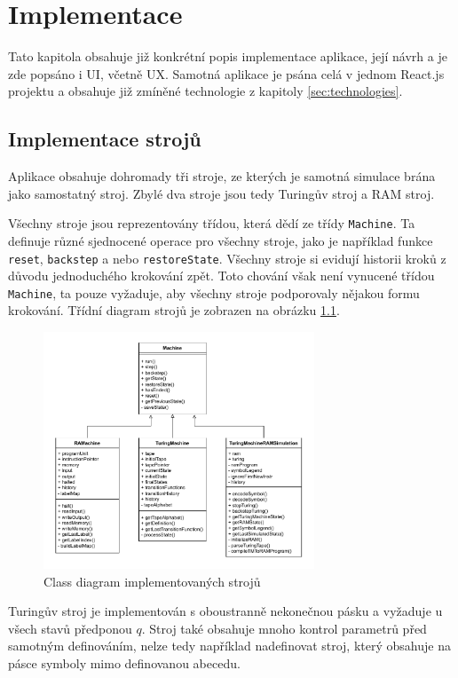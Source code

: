 \chapter{Implementace}
\label{sec:implementation}
Tato kapitola obsahuje již konkrétní popis implementace aplikace, její návrh a je zde popsáno i UI, včetně UX.
Samotná aplikace je psána celá v jednom React.js projektu a obsahuje již zmíněné technologie z kapitoly \ref{sec:technologies}.

\section{Implementace strojů}
\label{sec:machine_impl}
Aplikace obsahuje dohromady tři stroje, ze kterých je samotná simulace brána jako samostatný stroj. 
Zbylé dva stroje jsou tedy Turingův stroj a RAM stroj.

Všechny stroje jsou reprezentovány třídou, která dědí ze třídy \texttt{Machine}. Ta definuje různé sjednocené operace
pro všechny stroje, jako je například funkce \texttt{reset}, \texttt{backstep} a nebo \texttt{restoreState}. 
Všechny stroje si evidují historii kroků z důvodu jednoduchého krokování zpět. 
Toto chování však není vynucené třídou \texttt{Machine}, ta pouze vyžaduje, aby všechny stroje podporovaly nějakou formu krokování.
Třídní diagram strojů je zobrazen na obrázku \ref{fig:class_machines}.

\begin{figure}[h!]
	\centering
	\includegraphics[width=0.72\textwidth]{Figures/class_diagram.pdf}
	\caption{Class diagram implementovaných strojů}
	\label{fig:class_machines}
\end{figure}

Turingův stroj je implementován s oboustranně nekonečnou pásku a vyžaduje u všech stavů předponou $q$.
Stroj také obsahuje mnoho kontrol parametrů před samotným definováním, 
nelze tedy například nadefinovat stroj, který obsahuje na pásce symboly mimo definovanou abecedu.

